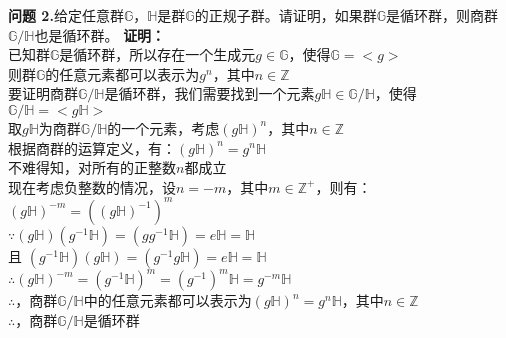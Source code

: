 \documentclass[a4paper]{CINTA}
\begin{document}
\textbf{问题 2.}给定任意群$\mathbb{G}$，$\mathbb{H}$是群$\mathbb{G}$的正规子群。请证明，如果群$\mathbb{G}$是循环群，则商群$\mathbb{G}/\mathbb{H}$也是循环群。
\textbf{证明：} \\
已知群$\mathbb{G}$是循环群，所以存在一个生成元$g \in \mathbb{G}$，使得$\mathbb{G}=<g>$ \\
则群$\mathbb{G}$的任意元素都可以表示为$g^n$，其中$n \in \mathbb{Z}$ \\
要证明商群$\mathbb{G}/\mathbb{H}$是循环群，我们需要找到一个元素$g\mathbb{H} \in \mathbb{G}/\mathbb{H}$，使得$\mathbb{G}/\mathbb{H}=<g\mathbb{H}>$ \\
取$g\mathbb{H}$为商群$\mathbb{G}/\mathbb{H}$的一个元素，考虑$(g\mathbb{H})^n$，其中$n \in \mathbb{Z}$ \\
根据商群的运算定义，有：$(g\mathbb{H})^n=g^n\mathbb{H}$ \\
不难得知，对所有的正整数$n$都成立 \\
现在考虑负整数的情况，设$n=-m$，其中$m \in \mathbb{Z}^+$，则有：\\
$(g\mathbb{H})^{-m}=((g\mathbb{H})^{-1})^m$ \\
$\because (g\mathbb{H})(g^{-1}\mathbb{H})=(gg^{-1}\mathbb{H})=e\mathbb{H}=\mathbb{H}$ \\
且 $(g^{-1}\mathbb{H})(g\mathbb{H})=(g^{-1}g\mathbb{H})=e\mathbb{H}=\mathbb{H}$ \\
$\therefore$$(g\mathbb{H})^{-m}=(g^{-1}\mathbb{H})^m=(g^{-1})^m\mathbb{H}=g^{-m}\mathbb{H}$ \\
$\therefore$，商群$\mathbb{G}/\mathbb{H}$中的任意元素都可以表示为$(g\mathbb{H})^n=g^n\mathbb{H}$，其中$n \in \mathbb{Z}$ \\
$\therefore$，商群$\mathbb{G}/\mathbb{H}$是循环群 \\
\end{document}
